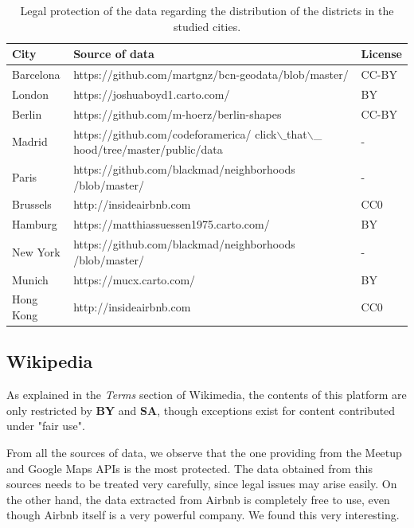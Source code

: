 \begin{table}[h]
\centering
\caption{Legal protection of the data regarding the distribution of the districts in the studied cities.}
\label{table_5.2}
\begin{tabular}{p{2cm} p{8cm} p{2cm}}
\hline
City      & Source of data                                                              & License                     \\
\hline
Barcelona & https://github.com/martgnz/bcn-geodata/blob/master/                         & CC-BY                       \\
London    & https://joshuaboyd1.carto.com/                                              & BY                          \\
Berlin    & https://github.com/m-hoerz/berlin-shapes                                    & CC-BY                     \\
Madrid    & https://github.com/codeforamerica/ click$\backslash \_$that$\backslash$\_ hood/tree/master/public/data & -               \\
Paris     & https://github.com/blackmad/neighborhoods /blob/master/                      & -               \\
Brussels  & http://insideairbnb.com                                                     & CC0     \\
Hamburg   & https://matthiassuessen1975.carto.com/                                      & BY                          \\
New York  & https://github.com/blackmad/neighborhoods /blob/master/                      & -              \\
Munich    & https://mucx.carto.com/                                                     & BY                          \\
Hong Kong & http://insideairbnb.com                                                     & CC0 \\
\hline
\end{tabular}
\end{table}
  

\subsection{Wikipedia}

As explained in the \textit{Terms} section of Wikimedia, the contents of this platform are only restricted by \textbf{BY} and \textbf{SA}, though exceptions exist for content contributed under "fair use".

\vspace{.75cm}

From all the sources of data, we observe that the one providing from the Meetup and Google Maps APIs is the most protected. The data obtained from this sources needs to be treated very carefully, since legal issues may arise easily. On the other hand, the data extracted from Airbnb is completely free to use, even though Airbnb itself is a very powerful company. We found this very interesting. 